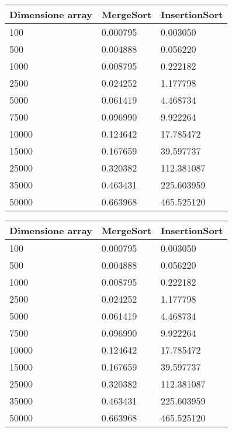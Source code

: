 \begin{tabular}{|l|l|l|}
\toprule
\hline
 Dimensione array &  MergeSort &  InsertionSort \\
\midrule
              100 &   0.000795 &       0.003050 \\
              500 &   0.004888 &       0.056220 \\
             1000 &   0.008795 &       0.222182 \\
             2500 &   0.024252 &       1.177798 \\
             5000 &   0.061419 &       4.468734 \\
             7500 &   0.096990 &       9.922264 \\
            10000 &   0.124642 &      17.785472 \\
            15000 &   0.167659 &      39.597737 \\
            25000 &   0.320382 &     112.381087 \\
            35000 &   0.463431 &     225.603959 \\
            50000 &   0.663968 &     465.525120 \\
\bottomrule
\end{tabular}
\begin{tabular}{|l|l|l|}
\toprule
\hline
 Dimensione array &  MergeSort &  InsertionSort \\ \hline

\midrule
              100 &   0.000795 &       0.003050 \\ \hline

              500 &   0.004888 &       0.056220 \\ \hline

             1000 &   0.008795 &       0.222182 \\ \hline

             2500 &   0.024252 &       1.177798 \\ \hline

             5000 &   0.061419 &       4.468734 \\ \hline

             7500 &   0.096990 &       9.922264 \\ \hline

            10000 &   0.124642 &      17.785472 \\ \hline

            15000 &   0.167659 &      39.597737 \\ \hline

            25000 &   0.320382 &     112.381087 \\ \hline

            35000 &   0.463431 &     225.603959 \\ \hline

            50000 &   0.663968 &     465.525120 \\ \hline

\bottomrule
\end{tabular}
